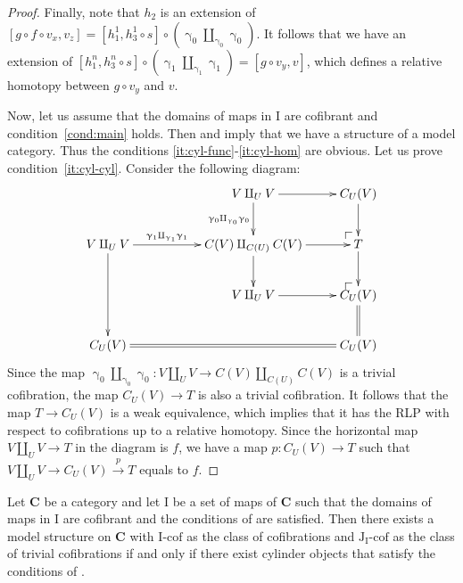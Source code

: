 \documentclass{tac}
\makeatletter
\theoremstyle{definition}
\newcommand{\cat}[1]{\mathbf{#1}}
\newcommand{\C}{\cat{C}}
\newcommand{\I}{\mathrm{I}}
\newcommand{\J}{\mathrm{J}}
\newcommand{\class}[2]{#1\text{-}\mathrm{#2}}
\newcommand{\Icof}[1][\I]{\class{#1}{cof}}
\newcommand{\Jcof}[1][]{\Icof[\J#1]}
\newcommand{\cyli}{\upgamma}
\newcommand{\po}[1][dr]{\save*!/#1+1.2pc/#1:(1,-1)@^{|-}\restore}
\makeatother
\begin{document}
\begin{proof}
Finally, note that $h_2$ is an extension of $[g \circ f \circ v_x, v_z] = [h^1_1, h^1_3 \circ s] \circ (\cyli_0 \amalg_{\cyli_0} \cyli_0)$.
It follows that we have an extension of $[h^n_1, h^n_3 \circ s] \circ (\cyli_1 \amalg_{\cyli_1} \cyli_1) = [g \circ v_y, v]$,
which defines a relative homotopy between $g \circ v_y$ and $v$.

Now, let us assume that the domains of maps in $\I$ are cofibrant and condition~\eqref{cond:main} holds.
Then  and  imply that we have a structure of a model category.
Thus the conditions \eqref{it:cyl-func}-\eqref{it:cyl-hom} are obvious.
Let us prove condition~\eqref{it:cyl-cyl}.
Consider the following diagram:
\[ \xymatrix{                                                                    & & V \amalg_U V \ar[r] \ar[d]_{\cyli_0 \amalg_{\cyli_0} \cyli_0} & C_U(V) \ar[d] \\
                V \amalg_U V \ar[rr]^-{\cyli_1 \amalg_{\cyli_1} \cyli_1} \ar[dd] & & C(V) \amalg_{C(U)} C(V) \ar[d] \ar[r]                         & \po T \ar[d] \\
                                                                                 & & V \amalg_U V \ar[r]                                           & \po C_U(V) \ar@{=}[d] \\
                C_U(V) \ar@{=}[rrr]                                              & &                                                               & C_U(V)
            } \]
Since the map $\cyli_0 \amalg_{\cyli_0} \cyli_0 : V \amalg_U V \to C(V) \amalg_{C(U)} C(V)$ is a trivial cofibration, the map $C_U(V) \to T$ is also a trivial cofibration.
It follows that the map $T \to C_U(V)$ is a weak equivalence, which implies that it has the RLP with respect to cofibrations up to a relative homotopy.
Since the horizontal map $V \amalg_U V \to T$ in the diagram is $f$, we have a map $p : C_U(V) \to T$ such that $V \amalg_U V \to C_U(V) \overset{p}\to T$ equals to $f$.
\end{proof}

\begin{cor}
Let $\C$ be a category and let $\I$ be a set of maps of $\C$ such that the domains of maps in $\I$ are cofibrant and the conditions of  are satisfied.
Then there exists a model structure on $\C$ with $\Icof$ as the class of cofibrations and $\Jcof[_\I]$ as the class of trivial cofibrations
if and only if there exist cylinder objects that satisfy the conditions of .
\end{cor}
\end{document}
